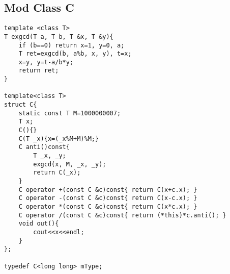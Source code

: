 \subsection{Mod Class C}
\begin{lstlisting}
template <class T>
T exgcd(T a, T b, T &x, T &y){
	if (b==0) return x=1, y=0, a;
	T ret=exgcd(b, a%b, x, y), t=x;
	x=y, y=t-a/b*y;
	return ret;
}

template<class T>
struct C{
	static const T M=1000000007;
	T x;
	C(){}
	C(T _x){x=(_x%M+M)%M;}
	C anti()const{
		T _x, _y;
		exgcd(x, M, _x, _y);
		return C(_x);
	}
	C operator +(const C &c)const{ return C(x+c.x); }
	C operator -(const C &c)const{ return C(x-c.x); }
	C operator *(const C &c)const{ return C(x*c.x); }
	C operator /(const C &c)const{ return (*this)*c.anti(); }
	void out(){
		cout<<x<<endl;
	}
};

typedef C<long long> mType;
\end{lstlisting}
